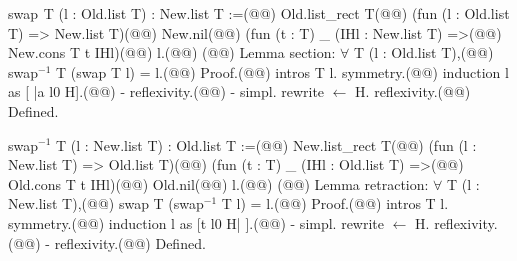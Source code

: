 swap$\phantom{^{2}}$T (l : Old.list T) : New.list T :=(@\vspace{-0.04cm}@)
  Old.list_rect T(@\vspace{-0.04cm}@)
    (fun (l : Old.list T) => New.list T)(@\vspace{-0.04cm}@)
    New.nil(@\vspace{-0.04cm}@)
    (fun (t : T) _ (IHl : New.list T) =>(@\vspace{-0.04cm}@)
      New.cons T t IHl)(@\vspace{-0.04cm}@)
    l.(@\vspace{-0.04cm}@)
(@\vspace{-0.04cm}@)
Lemma section: $\forall$ T (l : Old.list T),(@\vspace{-0.04cm}@)
  swap$^{-1}$ T (swap T l) = l.(@\vspace{-0.04cm}@)
Proof.(@\vspace{-0.04cm}@)
  intros T l. symmetry.(@\vspace{-0.04cm}@)
  induction l as [ |a l0 H].(@\vspace{-0.04cm}@)
  - reflexivity.(@\vspace{-0.04cm}@)
  - simpl. rewrite $\leftarrow$ H. reflexivity.(@\vspace{-0.04cm}@)
Defined.

swap$^{-1}$ T (l : New.list T) : Old.list T :=(@\vspace{-0.04cm}@)
  New.list_rect T(@\vspace{-0.04cm}@)
    (fun (l : New.list T) => Old.list T)(@\vspace{-0.04cm}@)
    (fun (t : T) _ (IHl : Old.list T) =>(@\vspace{-0.04cm}@)
      Old.cons T t IHl)(@\vspace{-0.04cm}@)
    Old.nil(@\vspace{-0.04cm}@)
    l.(@\vspace{-0.04cm}@)
(@\vspace{-0.04cm}@)
Lemma retraction: $\forall$ T (l : New.list T),(@\vspace{-0.04cm}@)
  swap T (swap$^{-1}$ T l) = l.(@\vspace{-0.04cm}@)
Proof.(@\vspace{-0.04cm}@)
  intros T l. symmetry.(@\vspace{-0.04cm}@)
  induction l as [t l0 H| ].(@\vspace{-0.04cm}@)
  - simpl. rewrite $\leftarrow$ H. reflexivity.(@\vspace{-0.04cm}@)
  - reflexivity.(@\vspace{-0.04cm}@)
Defined.

